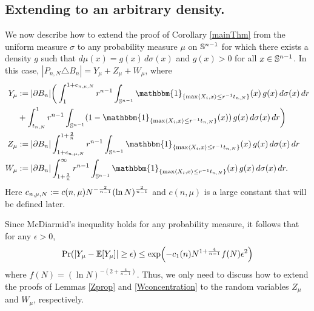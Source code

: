 \subsection*{Extending to an arbitrary density.}
We now describe how to extend the proof of Corollary \ref{mainThm} from the uniform measure $\sigma$ to any probability measure $\mu$ on $\mathbb{S}^{n-1}$ for which there exists a density $g$ such that $d\mu(x) = g(x)\,d\sigma(x)$ and $g(x)>0$ for all $x\in\mathbb{S}^{n-1}$. In this case, $|P_{n,N}\triangle B_n| = Y_\mu + Z_\mu + W_\mu$, where 
\begin{align*}Y_{\mu} & :=|\partial B_n|\bigg(\int_{1}^{1+c_{n,\mu,N}}r^{n-1}\int_{\mathbb{S}^{n-1}}\mathbbm{1}_{\{\max\langle X_{i},x\rangle\leq r^{-1}t_{n,N}\}}(x)\,g(x)\,d\sigma(x)\,dr\\
&  +\int_{t_{n,N}}^{1}r^{n-1}\int_{\mathbb{S}^{n-1}}(1-\mathbbm{1}_{\{\max\langle X_{i},x\rangle\leq r^{-1}t_{n,N}\}}(x))\,g(x)\,d\sigma(x)\,dr\bigg)\\ %
Z_{\mu} & :=|\partial B_n|\int_{1+c_{n,\mu,N}}^{1+\frac{2}{n}}r^{n-1}\int_{\mathbb{S}^{n-1}}\mathbbm{1}_{\{\max\langle X_{i},x\rangle\leq r^{-1}t_{n,N}\}}(x)\,g(x)\,d\sigma(x)\,dr\\
W_{\mu} & :=|\partial B_n|\int_{1+\frac{2}{n}}^{\infty}r^{n-1}\int_{\mathbb{S}^{n-1}}\mathbbm{1}_{\{\max\langle X_{i},x\rangle\leq r^{-1}t_{n,N}\}}(x)\,g(x)\,d\sigma(x)\,dr.%
%
\end{align*}
Here $ c_{n,\mu,N}:=c(n,\mu)N^{-\frac 2{n-1}}(\ln N)^{\frac{2}{n-1}} $ and $ c(n,\mu) $ is a large constant that will be defined later.

Since McDiarmid's inequality holds for any probability measure, it follows that for any $\epsilon>0$,
\[
\Pr(|Y_\mu-\E[Y_\mu]| \geq \epsilon) \leq
\exp\left(-c_1(n)N^{1+\frac{4}{n-1}}f(N)\epsilon^2\right)
\]
where $f(N)=(\ln N)^{-(2+\frac{4}{n-1})}$. Thus, we only need to discuss how to extend the proofs of Lemmas \ref{Zprop} and \ref{Wconcentration} to the random variables $Z_\mu$ and $W_\mu$, respectively.

